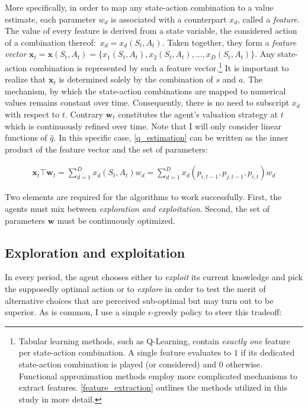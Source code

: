 More specifically, in order to map any state-action combination to a value estimate, each parameter $w_d$ is associated with a counterpart $x_d$, called a \emph{feature}. The value of every feature is derived  from a state variable, the considered action of a combination thereof:\ $x_d = x_d(S_t, A_t)$. Taken together, they form a \emph{feature vector} $\boldsymbol{x}_t = \boldsymbol{x}(S_t, A_t) = \{x_1(S_t, A_t), x_2(S_t, A_t), ..., x_D(S_t, A_t)\}$. Any state-action combination is represented by such a feature vector.\footnote{Tabular learning methods, such as Q-Learning, contain \emph{exactly one} feature per state-action combination. A single feature evaluates to $1$ if its dedicated state-action combination is played (or considered) and $0$ otherwise. Functional approximation methods employ more complicated mechanisms to extract features. \autoref{feature_extraction} outlines the methods utilized in this study in more detail.} It is important to realize that $\boldsymbol{x}_t$ is determined solely by the combination of $s$ and $a$. The mechanism, by which the state-action combinations are mapped to numerical values remains constant over time. Consequently, there is no need to subscript $x_d$ with respect to $t$. Contrary $\boldsymbol{w}_t$ constitutes the agent's valuation strategy at $t$ which is continuously refined over time. Note that I will only consider linear functions of $\hat{q}$. In this specific case, \autoref{q_estimation} can be written as the inner product of the feature vector and the set of parameters:

\begin{gather}\label{q_estimation_linear}
\boldsymbol{x}_t \top \boldsymbol{w}_t = \sum_{d=1}^{D} x_d(S_t, A_t) w_d = \sum_{d=1}^{D} x_d(p_{i, t-1}, p_{j, t-1}, p_{i, t}) w_d
\end{gather}

Two elements are required for the algorithms to work successfully. First, the agents must mix between \emph{exploration and exploitation}. Second, the set of parameters $\boldsymbol{w}$ must be continuously optimized.

\subsection{Exploration and exploitation} 
In every period, the agent chooses either to \emph{exploit} its current knowledge and pick the supposedly optimal action or to \emph{explore} in order to test the merit of alternative choices that are perceived sub-optimal but may turn out to be superior. As is common, I use a simple $\epsilon$-greedy policy to steer this tradeoff:

